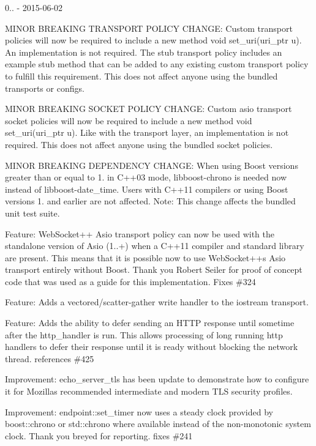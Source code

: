 0.. -\/ 2015-\/06-\/02
\begin{DoxyItemize}
\item MINOR BREAKING TRANSPORT POLICY CHANGE\+: Custom transport policies will now be required to include a new method {\ttfamily void set\+\_\+uri(uri\+\_\+ptr u)}. An implementation is not required. The stub transport policy includes an example stub method that can be added to any existing custom transport policy to fulfill this requirement. This does not affect anyone using the bundled transports or configs.
\item MINOR BREAKING SOCKET POLICY CHANGE\+: Custom asio transport socket policies will now be required to include a new method {\ttfamily void set\+\_\+uri(uri\+\_\+ptr u)}. Like with the transport layer, an implementation is not required. This does not affect anyone using the bundled socket policies.
\item MINOR BREAKING DEPENDENCY CHANGE\+: When using Boost versions greater than or equal to 1. in C++03 mode, {\ttfamily libboost-\/chrono} is needed now instead of {\ttfamily libboost-\/date\+\_\+time}. Users with C++11 compilers or using Boost versions 1. and earlier are not affected. Note\+: This change affects the bundled unit test suite.
\item Feature\+: Web\+Socket++ Asio transport policy can now be used with the standalone version of Asio (1..+) when a C++11 compiler and standard library are present. This means that it is possible now to use Web\+Socket++\textquotesingle{}s Asio transport entirely without Boost. Thank you Robert Seiler for proof of concept code that was used as a guide for this implementation. Fixes \#324
\item Feature\+: Adds a vectored/scatter-\/gather write handler to the iostream transport.
\item Feature\+: Adds the ability to defer sending an HTTP response until sometime after the {\ttfamily http\+\_\+handler} is run. This allows processing of long running http handlers to defer their response until it is ready without blocking the network thread. references \#425
\item Improvement\+: {\ttfamily echo\+\_\+server\+\_\+tls} has been update to demonstrate how to configure it for Mozilla\textquotesingle{}s recommended intermediate and modern TLS security profiles.
\item Improvement\+: {\ttfamily endpoint\+::set\+\_\+timer} now uses a steady clock provided by {\ttfamily boost\+::chrono} or {\ttfamily std\+::chrono} where available instead of the non-\/monotonic system clock. Thank you breyed for reporting. fixes \#241

\end{DoxyItemize}
